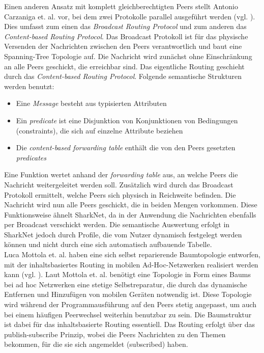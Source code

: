 Einen anderen Ansatz mit komplett gleichberechtigten Peers stellt Antonio Carzaniga et. al. vor, bei dem zwei Protokolle parallel ausgeführt werden (vgl. \citet[S. 918ff]{Carzaniga2004}). Dies umfasst zum einen das \textit{Broadcast Routing Protocol} und zum anderen das \textit{Content-based Routing Protocol}. Das Broadcast Protokoll ist für das physische Versenden der Nachrichten zwischen den Peers verantwortlich und baut eine Spanning-Tree Topologie auf. Die Nachricht wird zunächst ohne Einschränkung an alle Peers geschickt, die erreichbar sind. Das eigentliche Routing geschieht durch das \textit{Content-based Routing Protocol}. Folgende semantische Strukturen werden benutzt:
\begin{itemize}
	\item Eine \textit{Message} besteht aus typisierten Attributen
	\item Ein \textit{predicate} ist eine Disjunktion von Konjunktionen von Bedingungen (constraints), die sich auf einzelne Attribute beziehen
	\item Die \textit{content-based forwarding table} enthält die von den Peers gesetzten \textit{predicates} 	
\end{itemize}
Eine Funktion wertet anhand der \textit{forwarding table} aus, an welche Peers die Nachricht weitergeleitet werden soll. Zusätzlich wird durch das Broadcast Protokoll ermittelt, welche Peers sich physisch in Reichweite befinden. Die Nachricht wird nun alle Peers geschickt, die in beiden Mengen vorkommen. Diese Funktionsweise ähnelt SharkNet, da in der Anwendung die Nachrichten ebenfalls per Broadcast verschickt werden. Die semantische Auswertung erfolgt in SharkNet jedoch durch Profile, die vom Nutzer dynamisch festgelegt werden können und nicht durch eine sich automatisch aufbauende Tabelle. 
\\Luca Mottola et. al. haben eine sich selbst reparierende Baumtopologie entworfen, mit der inhaltsbasiertes Routing in mobilen Ad-Hoc-Netzwerken realisiert werden kann (vgl. \citet[S. 946ff]{Mottola2008}). Laut Mottola et. al. benötigt eine Topologie in Form eines Baums bei ad hoc Netzwerken eine stetige Selbstreparatur, die durch das dynamische Entfernen und Hinzufügen von mobilen Geräten notwendig ist. Diese Topologie wird während der Programmausführung auf den Peers stetig angepasst, um auch bei einem häufigen Peerwechsel weiterhin benutzbar zu sein. Die Baumstruktur ist dabei für das inhaltsbasierte Routing essentiell. Das Routing erfolgt über das publish-subscribe Prinzip, wobei die Peers Nachrichten zu den Themen bekommen, für die sie sich angemeldet (subscribed) haben. 
